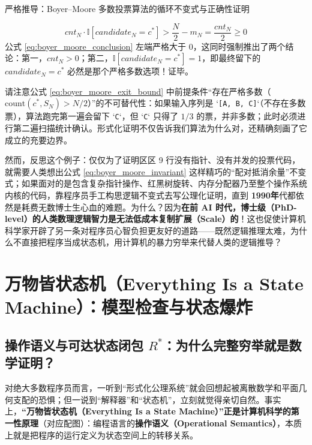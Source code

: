 \documentclass[a4paper]{article}
\begin{document}
\begin{knowledgebox}{严格推导：Boyer--Moore 多数投票算法的循环不变式与正确性证明}
\begin{enumerate}
    \begin{equation}
    \mathit{cnt}_N \cdot \mathbb{I}[\mathit{candidate}_N = c^*] > \frac{N}{2} - m_N = \frac{\mathit{cnt}_N}{2} \ge 0
    \label{eq:boyer_moore_conclusion}
    \end{equation}
    公式 \eqref{eq:boyer_moore_conclusion} 左端严格大于 $0$，这同时强制推出了两个结论：第一，$\mathit{cnt}_N > 0$；第二，$\mathbb{I}[\mathit{candidate}_N = c^*] = 1$，即最终留下的 $\mathit{candidate}_N = c^*$ 必然是那个严格多数选项！证毕。
\end{enumerate}
\end{knowledgebox}

请注意公式 \eqref{eq:boyer_moore_exit_bound} 中前提条件“存在严格多数（$\mathrm{count}(c^*, S_N) > N/2$）”的不可替代性：如果输入序列是 `\texttt{[A, B, C]}`（不存在多数票），算法跑完第一遍会留下 `\texttt{C}`，但 `\texttt{C}` 只得了 $1/3$ 的票，并非多数；此时必须进行第二遍扫描统计确认。形式化证明不仅告诉我们算法为什么对，还精确刻画了它成立的充要边界。

然而，反思这个例子：仅仅为了证明区区 9 行没有指针、没有并发的投票代码，就需要人类想出公式 \eqref{eq:boyer_moore_invariant} 这样精巧的“配对抵消余量”不变式；如果面对的是包含复杂指针操作、红黑树旋转、内存分配器乃至整个操作系统内核的代码，靠程序员手工构思逻辑不变式去写公理化证明，直到 \textbf{1990年}代都依然是耗费无数博士生心血的难题。为什么？因为\textbf{在前 AI 时代，博士级（PhD-level）的人类数理逻辑智力是无法低成本复制扩展（Scale）的}！这也促使计算机科学家开辟了另一条对程序员心智负担更友好的道路——既然逻辑推理太难，为什么不直接把程序当成状态机，用计算机的暴力穷举来代替人类的逻辑推导？

\section{万物皆状态机（Everything Is a State Machine）：模型检查与状态爆炸}

\subsection{操作语义与可达状态闭包 $R^*$：为什么完整穷举就是数学证明？}

对绝大多数程序员而言，一听到“形式化公理系统”就会回想起被离散数学和平面几何支配的恐惧；但一说到“解释器”和“状态机”，立刻就觉得亲切自然。事实上，\textbf{“万物皆状态机（Everything Is a State Machine）”正是计算机科学的第一性原理}（对应配图）：编程语言的\textbf{操作语义（Operational Semantics）}，本质上就是把程序的运行定义为状态空间上的转移关系。
\end{document}
